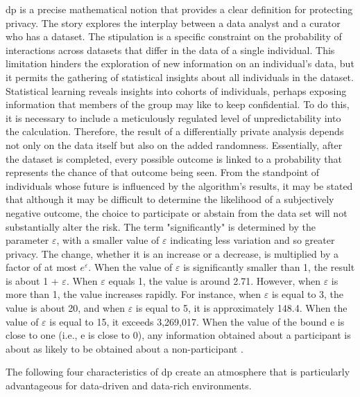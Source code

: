 \acrshort{dp} is a precise mathematical notion that provides a clear definition for protecting privacy. The story explores the interplay between a data analyst and a curator who has a dataset. The stipulation is a specific constraint on the probability of interactions across datasets that differ in the data of a single individual. This limitation hinders the exploration of new information on an individual's data, but it permits the gathering of statistical insights about all individuals in the dataset. Statistical learning reveals insights into cohorts of individuals, perhaps exposing information that members of the group may like to keep confidential. To do this, it is necessary to include a meticulously regulated level of unpredictability into the calculation. Therefore, the result of a differentially private analysis depends not only on the data itself but also on the added randomness. Essentially, after the dataset is completed, every possible outcome is linked to a probability that represents the chance of that outcome being seen. From the standpoint of individuals whose future is influenced by the algorithm's results, it may be stated that although it may be difficult to determine the likelihood of a subjectively negative outcome, the choice to participate or abstain from the data set will not substantially alter the risk. The term "significantly" is determined by the parameter $\varepsilon$, with a smaller value of $\varepsilon$ indicating less variation and so greater privacy. The change, whether it is an increase or a decrease, is multiplied by a factor of at most $e^\varepsilon$. When the value of $\varepsilon$ is significantly smaller than 1, the result is about 1 + $\varepsilon$. When $\varepsilon$ equals 1, the value is around 2.71. However, when $\varepsilon$ is more than 1, the value increases rapidly. For instance, when $\varepsilon$ is equal to 3, the value is about 20, and when $\varepsilon$ is equal to 5, it is approximately 148.4. When the value of $\varepsilon$ is equal to 15, it exceeds 3,269,017. When the value of the bound e is close to one (i.e., e is close to 0), any information obtained about a participant is about as likely to be obtained about a non-participant \cite{DWORK2019}.

The following four characteristics of \acrshort{dp} create an atmosphere that is particularly advantageous for data-driven and data-rich environments.

